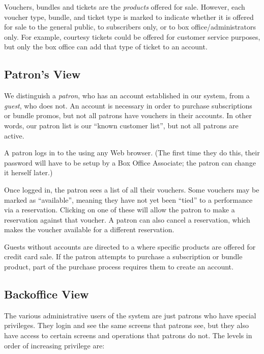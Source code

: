 Vouchers, bundles and tickets are the \emph{products} offered for sale.
However, each voucher type, bundle, and ticket type is marked to
indicate whether it is offered for sale to the general public, to
subscribers only, or to box office/administrators only.  For example,
courtesy tickets could be offered for customer service purposes, but
only the box office can add that type of ticket to an account.

\subsection{Patron's View}

We distinguish a \emph{patron}, who has an account established in our
system, from a \emph{guest}, who does not.  An account is necessary in
order to purchase subscriptions or bundle promos, but not all patrons
have vouchers in their accounts.  In other words, our patron list is our ``known
customer list'', but not all patrons are active.

A patron logs in to the \af using any Web browser.  (The first time they
do this, their password will have to be setup by a Box Office
Associate; the patron can change it herself later.)

Once logged in, the patron sees a list of all their vouchers.  Some
vouchers may be marked as ``available'', meaning they have not yet been
``tied'' to a performance via a reservation.  Clicking on one of these
will allow the patron to make a reservation against that voucher.
A patron can also cancel a reservation, which makes the voucher
available for a different reservation.

Guests without accounts are directed to a  where specific
products are offered for credit card sale.  If the patron attempts to
purchase a subscription or bundle product, part of the purchase process
requires them to create an account.

\subsection{Backoffice View}

The various administrative users of the system are just patrons who have
special privileges.  They login and see the same screens that patrons
see, but they also have access to certain screens and operations that
patrons do not.  The levels in order of increasing privilege are:

